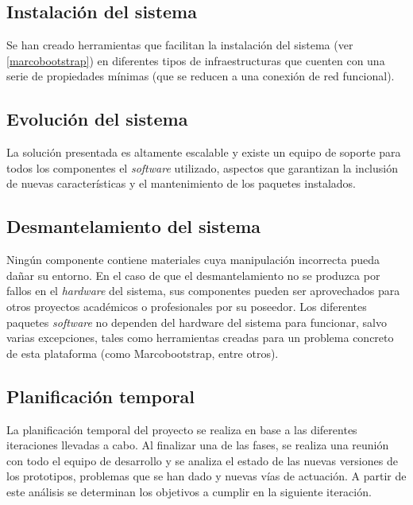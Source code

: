 \subsection{Instalación del sistema}

Se han creado herramientas que facilitan la instalación del sistema (ver \ref{marcobootstrap}) en diferentes tipos de infraestructuras que cuenten con una serie de propiedades mínimas (que se reducen a una conexión de red funcional).

\subsection{Evolución del sistema}

La solución presentada es altamente escalable y existe un equipo de soporte para todos los componentes el \textit{software} utilizado, aspectos que garantizan la inclusión de nuevas características y el mantenimiento de los paquetes instalados.  

\subsection{Desmantelamiento del sistema}

Ningún componente contiene materiales cuya manipulación incorrecta pueda dañar su entorno. En el caso de que el desmantelamiento no se produzca por fallos en el \textit{hardware} del sistema, sus componentes pueden ser aprovechados para otros proyectos académicos o profesionales por su poseedor. Los diferentes paquetes \textit{software} no dependen del hardware del sistema para funcionar, salvo varias excepciones, tales como herramientas creadas para un problema concreto de esta plataforma (como Marcobootstrap, entre otros).


\subsection{Planificación temporal}


La planificación temporal del proyecto se realiza en base a las diferentes iteraciones llevadas a cabo. Al finalizar una de las fases, se realiza una reunión con todo el equipo de desarrollo y se analiza el estado de las nuevas versiones de los prototipos, problemas que se han dado y nuevas vías de actuación. A partir de este análisis se determinan los objetivos a cumplir en la siguiente iteración.

\vspace{2cm}

